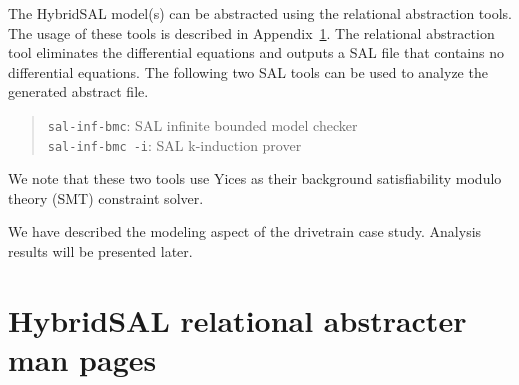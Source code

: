 \documentclass{llncs}
\begin{document}
The HybridSAL model(s) can be abstracted using the relational abstraction tools.
The usage of these tools is described in Appendix~\ref{app:1}.
The relational abstraction tool eliminates the differential equations and outputs
a SAL file that contains no differential equations.  The following two
SAL tools can be used to analyze the generated abstract file.
\begin{quote}
 {\tt{sal-inf-bmc}}: SAL infinite bounded model checker
\\
 {\tt{sal-inf-bmc -i}}:  SAL k-induction prover
\end{quote}
We note that these two tools use Yices as their background 
satisfiability modulo theory (SMT) constraint solver.

We have described the modeling aspect of the drivetrain case study.
Analysis results will be presented later.






\appendix
\section{HybridSAL relational abstracter man pages}
\label{app:1}
\end{document}
